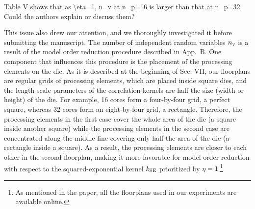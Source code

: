 \begin{reviewer}
Table V shows that as \textbackslash{}eta=1, n\_v at n\_p=16 is larger than that at n\_p=32. Could the authors explain or discuss them?
\end{reviewer}
\begin{authors}
This issue also drew our attention, and we thoroughly investigated it before submitting the manuscript.
The number of independent random variables ${n_\text{v}}$ is a result of the model order reduction procedure described in App.~B.
One component that influences this procedure is the placement of the processing elements on the die.
As it is described at the beginning of Sec. VII, our floorplans are regular grids of processing elements, which are placed inside square dies, and the length-scale parameters of the correlation kernels are half the size (width or height) of the die.
For example, 16 cores form a four-by-four grid, a perfect square, whereas 32 cores form an eight-by-four grid, a rectangle.
Therefore, the processing elements in the first case cover the whole area of the die (a square inside another square) while the processing elements in the second case are concentrated along the middle line covering only half the area of the die (a rectangle inside a square).
As a result, the processing elements are closer to each other in the second floorplan, making it more favorable for model order reduction with respect to the squared-exponential kernel $\fCorr_\SE$ prioritized by $\eta = 1$.\footnote{As mentioned in the paper, all the floorplans used in our experiments are available online.}

\begin{actions}
\end{actions}
\end{authors}

